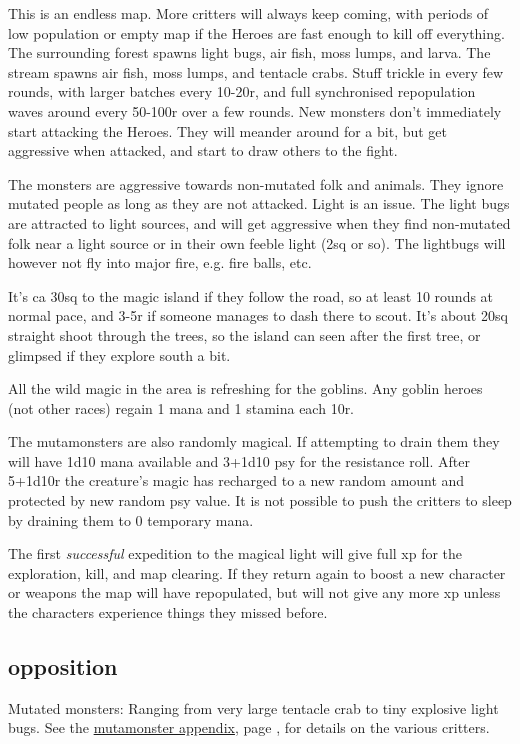 This is an endless map. More critters will always keep coming, with periods of low population or empty map if the Heroes are fast enough to kill off everything. The surrounding forest spawns light bugs, air fish, moss lumps, and larva. The stream spawns air fish, moss lumps, and tentacle crabs. Stuff trickle in every few rounds, with larger batches every 10-20r, and full synchronised repopulation waves around every 50-100r over a few rounds. New monsters don't immediately start attacking the Heroes. They will meander around for a bit, but get aggressive when attacked, and start to draw others to the fight.

The monsters are aggressive towards non-mutated folk and animals. They ignore mutated people as long as they are not attacked.
Light is an issue. The light bugs are attracted to light sources, and will get aggressive when they find non-mutated folk near a light source or in their own feeble light (2sq or so). The lightbugs will however not fly into major fire, e.g. fire balls, etc.

It's ca 30sq to the magic island if they follow the road, so at least 10 rounds at normal pace, and 3-5r if someone manages to dash there to scout. It's about 20sq straight shoot through the trees, so the island can seen after the first tree, or glimpsed if they explore south a bit.

All the wild magic in the area is refreshing for the goblins. Any goblin heroes (not other races) regain 1 mana and 1 stamina each 10r.

The mutamonsters are also randomly magical. If attempting to drain them they will have 1d10 mana available and 3+1d10 psy for the resistance roll. After 5+1d10r the creature's magic has recharged to a new random amount and protected by new random psy value. It is not possible to push the critters to sleep by draining them to 0 temporary mana.

The first \emph{successful} expedition to the magical light will give full xp for the exploration, kill, and map clearing. If they return again to boost a new character or weapons the map will have repopulated, but will not give any more xp unless the characters experience things they missed before.


\subsection*{opposition}
Mutated monsters: Ranging from very large tentacle crab to tiny explosive light bugs. See the \hyperref[appendixmutamonsters]{mutamonster appendix}, page \pageref{appendixmutamonsters}, for details on the various critters.

